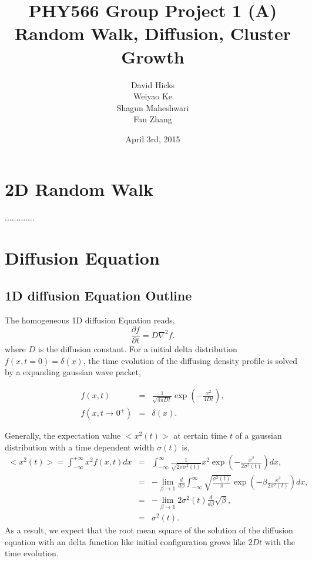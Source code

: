\documentclass[a4paper,12pt]{article}
\begin{document}
\title{PHY566 Group Project 1 (A) \\ Random Walk, Diffusion, Cluster Growth}
\date{\small April 3rd, 2015}
\author{David Hicks\\ Weiyao Ke \\ Shagun Maheshwari \\ Fan Zhang}

\maketitle

\section{2D Random Walk}
.............


\section{Diffusion Equation}
\subsection{1D diffusion Equation Outline}
\indent
\indent The homogeneous 1D diffusion Equation reads,
\begin{equation}
	\frac{\partial f}{\partial t} = D \nabla^2 f.
\end{equation}
where $D$ is the diffusion constant. For a initial delta distribution $f(x, t = 0) = \delta(x)$, the time evolution of the diffusing density profile is solved by a expanding gaussian wave packet,

\begin{eqnarray*}
	f(x,t) &=& \frac{1}{\sqrt{4\pi D t}} \exp{(-\frac{x^2}{4Dt})}, \\
	f(x, t \rightarrow 0^+) &=& \delta(x).
\end{eqnarray*}

Generally, the expectation value $<x^2(t)>$ at certain time $t$ of a gaussian distribution with a time dependent width $\sigma(t)$ is,
\begin{eqnarray*}
	<x^2(t)> = \int_{-\infty}^{+\infty} x^2 f(x,t) dx &=&  \int_{-\infty}^{\infty}  \frac{1}{\sqrt{2\pi \sigma^2(t)}} x^2 \exp{(-\frac{x^2}{2\sigma^2(t)})} dx, \\
	& = & -\lim_{\beta\rightarrow 1}\frac{d}{d\beta}\int_{-\infty}^{\infty}  \sqrt{\frac{\sigma^2(t)}{\pi}} \exp{(-\beta \frac{x^2}{2\sigma^2(t)})} dx, \\
	& = & -\lim_{\beta\rightarrow 1} 2\sigma^2(t)\frac{d}{d\beta}\sqrt{\beta}, \\
	& = & \sigma^2(t). 
\end{eqnarray*}
As a result, we expect that the root mean square of the solution of the diffusion equation with an delta function like initial configuration grows like $2Dt$ with the time evolution. 
\end{document}
